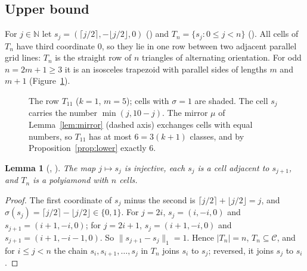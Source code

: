 \documentclass[11pt]{amsart}
\theoremstyle{plain}
\newtheorem{lemma}[theorem]{Lemma}
\theoremstyle{definition}
\newcommand{\N}{\mathbb{N}}
\newcommand{\C}{\mathcal{C}}
\begin{document}
\subsection{Upper bound}\label{sec:upper}

For $j\in\N$ let $s_j=(\lceil j/2\rceil,-\lfloor j/2\rfloor,0)$ () and $T_n=\{s_j:0\le j<n\}$ (). All cells of $T_n$ have third coordinate $0$, so they lie in one row between two adjacent parallel grid lines: $T_n$ is the straight row of $n$ triangles of alternating orientation. For odd $n=2m+1\ge3$ it is an isosceles trapezoid with parallel sides of lengths $m$ and $m+1$ (Figure~\ref{fig:strip}).

\begin{figure}[ht]
\centering
{}
\caption{The row $T_{11}$ ($k=1$, $m=5$); cells with $\sigma=1$ are shaded. The cell $s_j$ carries the number $\min(j,10-j)$. The mirror $\mu$ of Lemma~\ref{lem:mirror} (dashed axis) exchanges cells with equal numbers, so $T_{11}$ has at most $6=3(k+1)$ classes, and by Proposition~\ref{prop:lower} exactly $6$.}
\label{fig:strip}
\end{figure}

\begin{lemma}[, ]\label{lem:strip}
The map $j\mapsto s_j$ is injective, each $s_j$ is a cell adjacent to $s_{j+1}$, and $T_n$ is a polyiamond with $n$ cells.
\end{lemma}

\begin{proof}
The first coordinate of $s_j$ minus the second is $\lceil j/2\rceil+\lfloor j/2\rfloor=j$, and $\sigma(s_j)=\lceil j/2\rceil-\lfloor j/2\rfloor\in\{0,1\}$. For $j=2i$, $s_j=(i,-i,0)$ and $s_{j+1}=(i+1,-i,0)$; for $j=2i+1$, $s_j=(i+1,-i,0)$ and $s_{j+1}=(i+1,-i-1,0)$. So $\|s_{j+1}-s_j\|_1=1$. Hence $|T_n|=n$, $T_n\subseteq\C$, and for $i\le j<n$ the chain $s_i,s_{i+1},\dots,s_j$ in $T_n$ joins $s_i$ to $s_j$; reversed, it joins $s_j$ to $s_i$.
\end{proof}
\end{document}
